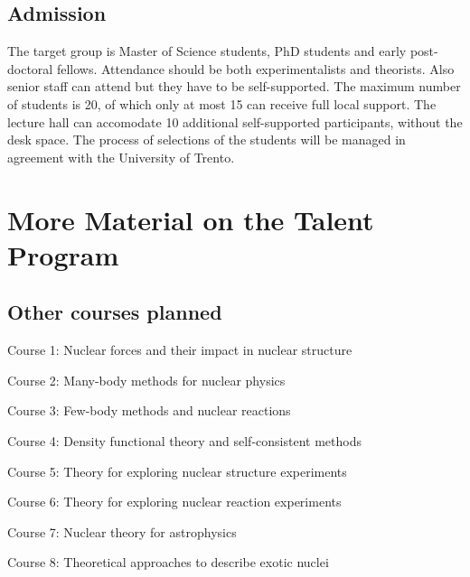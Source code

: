\documentclass[prc,amsart,english]{revtex4}
\begin{document}
\subsection{Admission}
The target group is Master of Science students, PhD students and early post-doctoral fellows.
Attendance should be both experimentalists and theorists.
Also senior staff can attend but they have to be self-supported.
The maximum number of students is 20, of which only at most 15 can
receive full local support. The lecture hall can accomodate 10
additional  self-supported participants, without the desk space.
The process of selections of the students will be managed in agreement with the University of Trento.

\section{More Material on the Talent Program}
\subsection{Other courses planned}

Course 1: Nuclear forces and their impact in nuclear structure


Course 2: Many-body methods for nuclear physics


Course 3: Few-body methods and nuclear reactions


Course 4: Density functional theory and self-consistent methods


Course 5: Theory for exploring nuclear structure experiments


Course 6: Theory for exploring nuclear reaction experiments


Course 7: Nuclear theory for astrophysics


Course 8: Theoretical approaches to describe exotic nuclei
\end{document}
